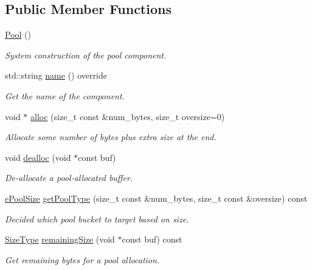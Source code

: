 \subsection*{Public Member Functions}
\begin{DoxyCompactItemize}
\item 
\hyperlink{structvt_1_1pool_1_1_pool_a55a236c42c331940884370c85fb18e36}{Pool} ()
\begin{DoxyCompactList}\small\item\em System construction of the pool component. \end{DoxyCompactList}\item 
std\+::string \hyperlink{structvt_1_1pool_1_1_pool_a02fa54fc3cca0d388f25f397dfd997ab}{name} () override
\begin{DoxyCompactList}\small\item\em Get the name of the component. \end{DoxyCompactList}\item 
void $\ast$ \hyperlink{structvt_1_1pool_1_1_pool_a0bf20e8b4ad1b85fb8952d81d433da55}{alloc} (size\+\_\+t const \&num\+\_\+bytes, size\+\_\+t oversize=0)
\begin{DoxyCompactList}\small\item\em Allocate some number of bytes plus extra size at the end. \end{DoxyCompactList}\item 
void \hyperlink{structvt_1_1pool_1_1_pool_a73ef123aa04b44ae875716e2c7b95cab}{dealloc} (void $\ast$const buf)
\begin{DoxyCompactList}\small\item\em De-\/allocate a pool-\/allocated buffer. \end{DoxyCompactList}\item 
\hyperlink{structvt_1_1pool_1_1_pool_ace8d36439e5e599a8ee68b2f1a6a6b28}{e\+Pool\+Size} \hyperlink{structvt_1_1pool_1_1_pool_a6b0dea52c80b6493431ce94840e7bc4a}{get\+Pool\+Type} (size\+\_\+t const \&num\+\_\+bytes, size\+\_\+t const \&oversize) const
\begin{DoxyCompactList}\small\item\em Decided which pool bucket to target based on size. \end{DoxyCompactList}\item 
\hyperlink{structvt_1_1pool_1_1_pool_a4030898e09d0160c24743a7b949c0d46}{Size\+Type} \hyperlink{structvt_1_1pool_1_1_pool_a2e81bedc1cd986b9994f66f614dac28d}{remaining\+Size} (void $\ast$const buf) const
\begin{DoxyCompactList}\small\item\em Get remaining bytes for a pool allocation. \end{DoxyCompactList}\item 

\end{DoxyCompactItemize}
